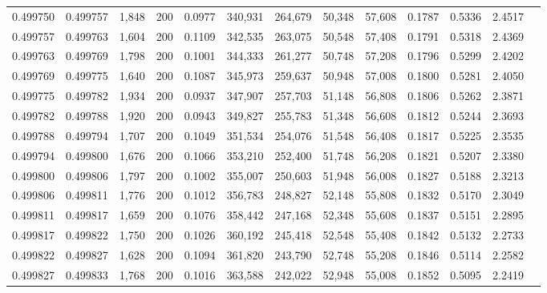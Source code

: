 \begin{tabular}{rrrrrrrrrrrrr}
0.499750 & 0.499757 & 1,848 & 200 &                                     0.0977 & 340,931 & 264,679 &  50,348 &  57,608 & 0.1787 & 0.5336 & 2.4517 \\
0.499757 & 0.499763 & 1,604 & 200 &                                     0.1109 & 342,535 & 263,075 &  50,548 &  57,408 & 0.1791 & 0.5318 & 2.4369 \\
0.499763 & 0.499769 & 1,798 & 200 &                                     0.1001 & 344,333 & 261,277 &  50,748 &  57,208 & 0.1796 & 0.5299 & 2.4202 \\
0.499769 & 0.499775 & 1,640 & 200 &                                     0.1087 & 345,973 & 259,637 &  50,948 &  57,008 & 0.1800 & 0.5281 & 2.4050 \\
0.499775 & 0.499782 & 1,934 & 200 &                                     0.0937 & 347,907 & 257,703 &  51,148 &  56,808 & 0.1806 & 0.5262 & 2.3871 \\
0.499782 & 0.499788 & 1,920 & 200 &                                     0.0943 & 349,827 & 255,783 &  51,348 &  56,608 & 0.1812 & 0.5244 & 2.3693 \\
0.499788 & 0.499794 & 1,707 & 200 &                                     0.1049 & 351,534 & 254,076 &  51,548 &  56,408 & 0.1817 & 0.5225 & 2.3535 \\
0.499794 & 0.499800 & 1,676 & 200 &                                     0.1066 & 353,210 & 252,400 &  51,748 &  56,208 & 0.1821 & 0.5207 & 2.3380 \\
0.499800 & 0.499806 & 1,797 & 200 &                                     0.1002 & 355,007 & 250,603 &  51,948 &  56,008 & 0.1827 & 0.5188 & 2.3213 \\
0.499806 & 0.499811 & 1,776 & 200 &                                     0.1012 & 356,783 & 248,827 &  52,148 &  55,808 & 0.1832 & 0.5170 & 2.3049 \\
0.499811 & 0.499817 & 1,659 & 200 &                                     0.1076 & 358,442 & 247,168 &  52,348 &  55,608 & 0.1837 & 0.5151 & 2.2895 \\
0.499817 & 0.499822 & 1,750 & 200 &                                     0.1026 & 360,192 & 245,418 &  52,548 &  55,408 & 0.1842 & 0.5132 & 2.2733 \\
0.499822 & 0.499827 & 1,628 & 200 &                                     0.1094 & 361,820 & 243,790 &  52,748 &  55,208 & 0.1846 & 0.5114 & 2.2582 \\
0.499827 & 0.499833 & 1,768 & 200 &                                     0.1016 & 363,588 & 242,022 &  52,948 &  55,008 & 0.1852 & 0.5095 & 2.2419 \\

\end{tabular}
